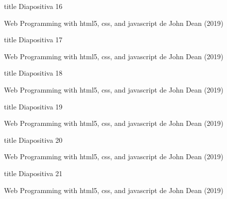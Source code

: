 \begin{frame}{title}
\justifying
Diapositiva 16


{\tiny Web Programming with html5, css, and javascript de John Dean (2019)}
\end{frame}

\begin{frame}{title}
\justifying
Diapositiva 17


{\tiny Web Programming with html5, css, and javascript de John Dean (2019)}
\end{frame}

\begin{frame}{title}
\justifying
Diapositiva 18


{\tiny Web Programming with html5, css, and javascript de John Dean (2019)}
\end{frame}

\begin{frame}{title}
\justifying
Diapositiva 19


{\tiny Web Programming with html5, css, and javascript de John Dean (2019)}
\end{frame}

\begin{frame}{title}
\justifying
Diapositiva 20


{\tiny Web Programming with html5, css, and javascript de John Dean (2019)}
\end{frame}

\begin{frame}{title}
\justifying
Diapositiva 21


{\tiny Web Programming with html5, css, and javascript de John Dean (2019)}
\end{frame}